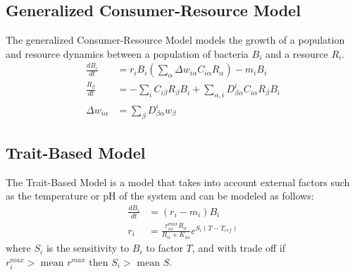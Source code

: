 \subsection{Generalized Consumer-Resource Model}
The generalized Consumer-Resource Model models the growth of a population and resource dynamics between a population of bacteria ${B}_i$ and a resource ${R}_i$. 
\begin{align}
    \frac{d{B}_i}{dt} &= r_i{B}_i \left(\sum_{\alpha} \Delta w_{i \alpha}C_{i \alpha}R_{\alpha}\right) - m_i {B}_i \\
    \frac{R_{\beta}}{dt} &= -\sum_i C_{i\beta}R_{\beta}{B_i} + \sum_{\alpha, i}D_{\beta\alpha}^{i}C_{i\alpha}R_{\beta}{B}_i \\
    \Delta w_{i\alpha} &= \sum_{\beta}D_{\beta \alpha}^{i}w_{\beta}
\end{align}

\subsection{Trait-Based Model}
The Trait-Based Model is a model that takes into account external factors such as the temperature or pH of the system and can be modeled as follows: 
\begin{align}
    \frac{dB_i}{dt} &= \left(r_i - m_i\right) B_i \\
    r_i &= \frac{r_{i\alpha}^{max}R_\alpha}{R_\alpha + K_{i\alpha}}e^{S_i\left(T-T_{ref}\right)}
\end{align}
where $S_i$ is the sensitivity to $B_i$ to factor $T$, and with trade off if $r_i^{max} > \text{ mean } r^{max} \text{ then } S_i > \text{ mean } S$. 


